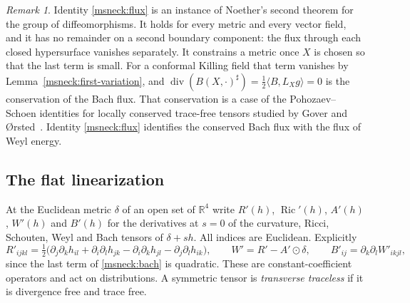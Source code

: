 \documentclass[11pt]{article}
\numberwithin{equation}{section}
\theoremstyle{definition}
\theoremstyle{remark}
\newtheorem{remark}[theorem]{Remark}
\DeclareMathOperator{\Ric}{Ric}
\begin{document}
\begin{remark}\label{msneck:noether-remark}
Identity \eqref{msneck:flux} is an instance of Noether's second
theorem for the group of diffeomorphisms. It holds for every metric
and every vector field, and it has no remainder on a second boundary
component: the flux through each closed hypersurface vanishes
separately. It constrains a metric once \(X\) is chosen so that the
last term is small. For a conformal Killing field that term vanishes
by Lemma~\ref{msneck:first-variation}, and
\(\operatorname{div}(B(X,\cdot)^\sharp)=\tfrac12\langle B,L_Xg\rangle=0\)
is the conservation of the Bach flux. That conservation is a case of
the Pohozaev--Schoen identities for locally conserved trace-free
tensors studied by Gover and \O rsted~\cite{GoverOrsted2010Universal}.
Identity \eqref{msneck:flux} identifies the conserved Bach flux with
the flux of Weyl energy.
\end{remark}

\subsection{The flat linearization}
\label{msneck:flat}

At the Euclidean metric \(\delta\) of an open set of \(\mathbb R^4\)
write \(R'(h)\), \(\Ric'(h)\), \(A'(h)\), \(W'(h)\) and \(B'(h)\) for
the derivatives at \(s=0\) of the curvature, Ricci, Schouten, Weyl and
Bach tensors of \(\delta+sh\). All indices are Euclidean. Explicitly
\[
 R'_{ijkl}=\tfrac12\bigl(\partial_j\partial_kh_{il}+\partial_i\partial_lh_{jk}
 -\partial_i\partial_kh_{jl}-\partial_j\partial_lh_{ik}\bigr),\qquad
 W'=R'-A'\odot\delta,\qquad B'_{ij}=\partial_k\partial_lW'_{ikjl},
\]
since the last term of \eqref{msneck:bach} is quadratic. These are
constant-coefficient operators and act on distributions. A symmetric
tensor is \emph{transverse traceless} if it is divergence free and trace
free.
\end{document}
